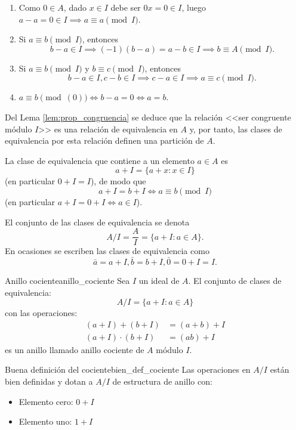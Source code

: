 \begin{proofbox}
    \begin{enumerate}
        \item Como $0 \in A$, dado $x \in I$ debe ser $0x = 0 \in I$, luego \(a - a = 0 \in I \implies a \equiv a \pmod{I}\).
        \item Si \(a \equiv b \pmod{I}\), entonces
        \[
        b - a \in I \implies (-1)(b-a) = a - b \in I \implies b \equiv A \pmod{I}.
        \]
        \item Si \(a \equiv b \pmod{I}\) y \(b \equiv c \pmod{I}\), entonces
        \[
        b - a \in I, c - b \in I \implies c - a \in I \implies a \equiv c \pmod{I}.
        \]
        \item \(a \equiv b \pmod{(0)} \iff b - a = 0 \iff a = b\).
    \end{enumerate}
\end{proofbox}

Del Lema \ref{lem:prop_congruencia} se deduce que la relación <<ser congruente módulo $I$>> es una relación de equivalencia en $A$ y, por tanto, las clases de equivalencia por esta relación definen una partición de $A$. 

La clase de equivalencia que contiene a un elemento $a \in A$ es
\[
a + I = \{a + x : x \in I\}
\]
(en particular $0 + I = I$), de modo que
\[
a + I = b + I \Leftrightarrow a \equiv b \pmod{I}
\]
(en particular $a + I = 0 + I \Leftrightarrow a \in I$). 

El conjunto de las clases de equivalencia se denota
\[
A/I = \frac{A}{I} = \{a + I : a \in A\}.
\]
En ocasiones se escriben las clases de equivalencia como
\[
\bar{a} = a + I, \bar{b} = b + I, \bar{0} = 0 + I = I.
\]

\begin{definition}{Anillo cociente}{anillo_cociente}
    Sea \(I\) un ideal de \(A\). El conjunto de clases de equivalencia:
    \[
    A/I = \{a + I : a \in A\}
    \]
    con las operaciones:
    \begin{align*}
        (a + I) + (b + I) &= (a + b) + I \\
        (a + I) \cdot (b + I) &= (ab) + I
    \end{align*}
    es un anillo llamado {anillo cociente de \(A\) módulo \(I\)}.
\end{definition}

\begin{proposition}{Buena definición del cociente}{bien_def_cociente}
    Las operaciones en \(A/I\) están bien definidas y dotan a \(A/I\) de estructura de anillo con:
    \begin{itemize}
        \item Elemento cero: \(0 + I\)
        \item Elemento uno: \(1 + I\)
    \end{itemize}
\end{proposition}

